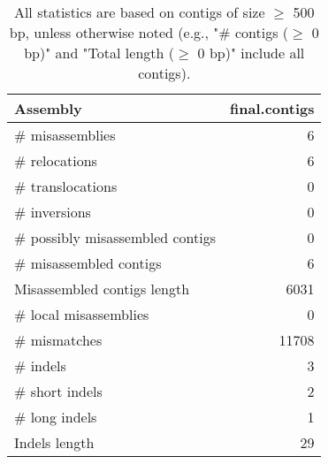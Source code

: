 \documentclass[12pt,a4paper]{article}
\begin{document}
\begin{table}[ht]
\begin{center}
\caption{All statistics are based on contigs of size $\geq$ 500 bp, unless otherwise noted (e.g., "\# contigs ($\geq$ 0 bp)" and "Total length ($\geq$ 0 bp)" include all contigs).}
\begin{tabular}{|l*{1}{|r}|}
\hline
Assembly & final.contigs \\ \hline
\# misassemblies & 6 \\ \hline
\hspace{5mm}\# relocations & 6 \\ \hline
\hspace{5mm}\# translocations & 0 \\ \hline
\hspace{5mm}\# inversions & 0 \\ \hline
\# possibly misassembled contigs & 0 \\ \hline
\# misassembled contigs & 6 \\ \hline
Misassembled contigs length & 6031 \\ \hline
\# local misassemblies & 0 \\ \hline
\# mismatches & 11708 \\ \hline
\# indels & 3 \\ \hline
\hspace{5mm}\# short indels & 2 \\ \hline
\hspace{5mm}\# long indels & 1 \\ \hline
Indels length & 29 \\ \hline
\end{tabular}
\end{center}
\end{table}
\end{document}
